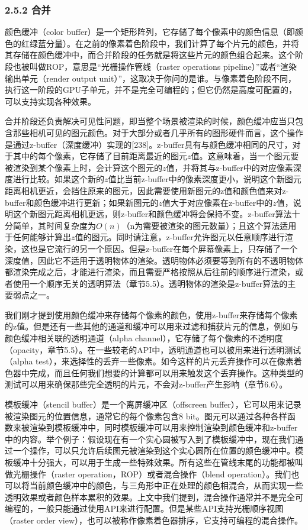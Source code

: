 \documentclass[
  paper=a4,
  ,captions=tableheading
]{scrartcl}
\begin{document}
\subsubsection{2.5.2 合并}\label{ux5408ux5e76}

颜色缓冲（color
buffer）是一个矩形阵列，它存储了每个像素中的颜色信息（即颜色的红绿蓝分量）。在之前的像素着色阶段中，我们计算了每个片元的颜色，并将其存储在颜色缓冲中，而合并阶段的任务就是将这些片元的颜色组合起来。这个阶段也被叫做ROP，意思是``光栅操作管线（raster
operations pipeline）''或者``渲染输出单元（render output
unit）''，这取决于你问的是谁。与像素着色阶段不同，执行这一阶段的GPU子单元，并不是完全可编程的；但它仍然是高度可配置的，可以支持实现各种效果。

合并阶段还负责解决可见性问题，即当整个场景被渲染的时候，颜色缓冲应当只包含那些相机可见的图元颜色。对于大部分或者几乎所有的图形硬件而言，这个操作是通过z-buffer（深度缓冲）实现的{[}238{]}。z-buffer具有与颜色缓冲相同的尺寸，对于其中的每个像素，它存储了目前距离最近的图元\(z\)值。这意味着，当一个图元要被渲染到某个像素上时，会计算这个图元的\(z\)值，并将其与z-buffer中的对应像素深度进行比较。如果这个新的\(z\)值比当前z-buffer中的像素深度更小，说明这个新图元距离相机更近，会挡住原来的图元，因此需要使用新图元的z值和颜色值来对z-buffer和颜色缓冲进行更新；如果新图元的\(z\)值大于对应像素在z-buffer中的\(z\)值，说明这个新图元距离相机更远，则z-buffer和颜色缓冲将会保持不变。z-buffer算法十分简单，其时间复杂度为\(O(n)\)（n为需要被渲染的图元数量）；且这个算法适用于任何能够计算出\(z\)值的图元。同时请注意，z-buffer允许图元以任意顺序进行渲染，这也是它流行的另一个原因。但是z-buffer在每个屏幕像素上，只存储了一个深度值，因此它不适用于透明物体的渲染。透明物体必须要等到所有的不透明物体都渲染完成之后，才能进行渲染，而且需要严格按照从后往前的顺序进行渲染，或者使用一个顺序无关的透明算法（章节5.5）。透明物体的渲染是z-buffer算法的主要弱点之一。

我们刚才提到使用颜色缓冲来存储每个像素的颜色，使用z-buffer来存储每个像素的z值。但是还有一些其他的通道和缓冲可以用来过滤和捕获片元的信息，例如与颜色缓冲相关联的透明通道（alpha
channel），它存储了每个像素的不透明度（opacity，章节5.5）。在一些较老的API中，透明通道也可以被用来进行透明测试（alpha
test），来选择性的丢弃一些像素。如今这样的片元丢弃操作可以在像素着色器中完成，而且任何我们想要的计算都可以用来触发这个丢弃操作。这种类型的测试可以用来确保那些完全透明的片元，不会对z-buffer产生影响（章节6.6）。

模板缓冲（stencil buffer）是一个离屏缓冲区（offscreen
buffer），它可以用来记录被渲染图元的位置信息，通常它的每个像素包含8
bit。图元可以通过各种各样函数来被渲染到模板缓冲中，同时模板缓冲可以用来控制渲染到颜色缓冲和z-buffer中的内容。举个例子：假设现在有一个实心圆被写入到了模板缓冲中，现在我们通过一个操作，可以只允许后续图元被渲染到这个实心圆所在位置的颜色缓冲中。模板缓冲十分强大，可以用于生成一些特殊效果。所有这些在管线末尾的功能都被叫做光栅操作（raster
operation，ROP）或者混合操作（blend
operation）。我们也可以将当前颜色缓冲中的颜色，与三角形中正在处理的颜色相混合，从而实现一些透明效果或者颜色样本累积的效果。上文中我们提到，混合操作通常并不是完全可编程的，一般只能通过使用API来进行配置。但是某些API支持光栅顺序视图（raster
order view），也可以被称作像素着色器排序，它支持可编程的混合操作。
\end{document}

